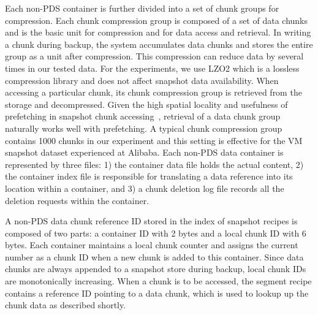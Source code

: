 Each non-PDS container is further divided into a set of chunk groups for compression. Each chunk compression group is composed of
a set of data chunks and is the basic unit for compression and for data access and retrieval. 
In writing a chunk during backup, the system accumulates data chunks and stores the entire
group as a unit after compression. This  compression can reduce data by several times  in our tested data.
For the experiments, we use LZO2 which is a lossless compression library and does not affect snapshot
data availability. 
When accessing a particular chunk, its chunk compression group is retrieved from the storage
and decompressed. Given the high spatial locality and usefulness of prefetching  in 
snapshot chunk accessing~\cite{Guo2011,Rhea2008},
retrieval of  a data chunk  group naturally works well with prefetching. 
A  typical chunk compression group contains 1000 chunks in our experiment and this setting is effective
for the VM snapshot dataset  experienced at Alibaba.
Each non-PDS data container is represented by three files:
1) the container data file holds the actual content, 
2) the container index file is responsible for translating a data reference
into its location within a container, and 
3) a chunk deletion log file records all the deletion requests within  the container.

A non-PDS data chunk reference ID stored in the index of snapshot recipes
is composed of two parts: a container ID with 2 bytes and a local chunk ID with 6 bytes.
Each container maintains a local  chunk counter and assigns the current number 
as a chunk ID  when  a new chunk is added to this  container. 
Since data chunks are always appended to a snapshot store during backup, 
local chunk IDs are monotonically increasing.
When a chunk is to be accessed, the segment recipe contains a reference ID pointing to  
a data chunk, which is used to lookup up the chunk data as described shortly.




